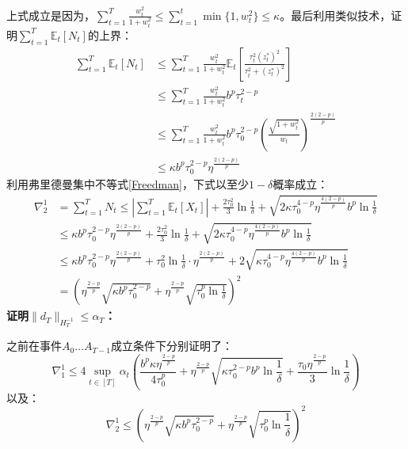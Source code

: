 \documentclass[UTF8,a4paper,10.5pt]{ctexart}
\newcommand{\E}{\mathbb{E}}
\begin{document}
上式成立是因为，$\sum_{t=1}^T\frac{w_t^2}{1+w_t^2} \leq \sum_{t=1}^{t}\min\{1,w^2_t\}\leq \kappa$。最后利用类似技术，证明$\sum_{t=1}^{T}\E_t[N_t]$的上界：
\begin{align*}
	\sum_{t=1}^{T}\E_t[N_t] &\leq \sum_{t=1}^{T} \frac{w_t^2}{1+w_t^2} \E_t[\frac{\tau_t^2(z^*_t)^2}{\tau_t^2+(z^*_t)^2}] \\
	& \leq \sum_{t=1}^{T} \frac{w_t^2}{1+w_t^2} b^p \tau_t^{2-p} \\
	& \leq \sum_{t=1}^{T} \frac{w_t^2}{1+w_t^2} b^p \tau_0^{2-p} \left(\frac{\sqrt{1+w_t^2}}{w_t}\right)^{\frac{2(2-p)}{p}} \\
	& \leq \kappa b^p \tau_0^{2-p} \eta^{\frac{2(2-p)}{p}}
\end{align*}
利用弗里德曼集中不等式\ref{Freedman}，下式以至少$1-\delta$概率成立：
\begin{align*}
	\nabla^1_2 &= \sum_{t=1}^T N_t \leq \left|\sum_{t=1}^{T}\E_t[X_t]\right| + \frac{2\tau_0^2}{3}\ln\frac{1}{\delta} + \sqrt{2 \kappa \tau_0^{4-p}\eta^{\frac{4(2-p)}{p}}b^p \ln\frac{1}{\delta}} \\
	&\leq \kappa b^p \tau_0^{2-p} \eta^{\frac{2(2-p)}{p}} + \frac{2\tau_0^2}{3}\ln\frac{1}{\delta} +  \sqrt{2 \kappa \tau_0^{4-p}\eta^{\frac{4(2-p)}{p}}b^p \ln\frac{1}{\delta}} \\
	& \leq \kappa b^p \tau_0^{2-p} \eta^{\frac{2(2-p)}{p}} + \tau_0^2\ln\frac{1}{\delta} \cdot \eta^{\frac{2(2-p)}{p}} +  2 \sqrt{\kappa \tau_0^{4-p}\eta^{\frac{4(2-p)}{p}}b^p \ln\frac{1}{\delta}} \\
	& = \left(\eta^{\frac{2-p}{p}}\sqrt{\kappa b^p\tau_0^{2-p}} + \eta^{\frac{2-p}{p}}\sqrt{\tau_0^p\ln\frac{1}{\delta}}\right)^2
\end{align*}
\textbf{证明$\|d_T\|_{H_T^{-1}} \leq \alpha_T$：}

之前在事件$A_0 \ldots A_{T-1}$成立条件下分别证明了：
\begin{equation}
	\nabla^1_1 \leq 4\sup_{t\in [T]}\alpha_t \left(\frac{b^p\kappa \eta^{\frac{2-p}{p}}}{4\tau_0^{p}} + \eta^{\frac{2-p}{p}}\sqrt{\kappa \tau_0^{2-p} b^p \ln\frac{1}{\delta}} + \frac{\tau_0 \eta^{\frac{2-p}{p}}}{3}\ln\frac{1}{\delta}\right)
\end{equation}
以及：
\begin{equation}
	\nabla^1_2 \leq \left(\eta^{\frac{2-p}{p}}\sqrt{\kappa b^p\tau_0^{2-p}} + \eta^{\frac{2-p}{p}}\sqrt{\tau_0^p\ln\frac{1}{\delta}}\right)^2
\end{equation}
\end{document}
